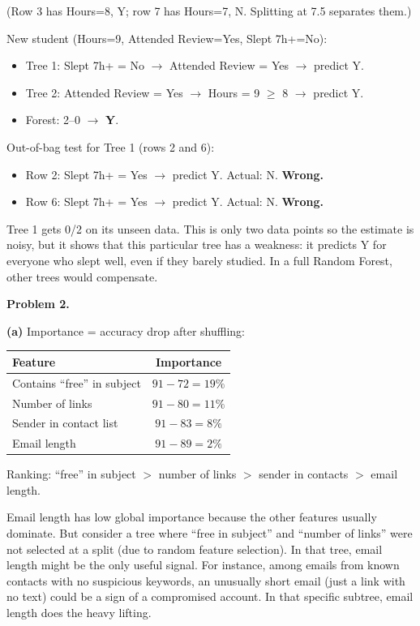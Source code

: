 \documentclass[11pt,a4paper]{article}
\begin{document}
(Row 3 has Hours=8, Y; row 7 has Hours=7, N. Splitting at 7.5 separates them.)

New student (Hours=9, Attended Review=Yes, Slept 7h+=No):
\begin{itemize}
\item Tree 1: Slept 7h+ = No $\to$ Attended Review = Yes $\to$ predict Y.
\item Tree 2: Attended Review = Yes $\to$ Hours = 9 $\geq$ 8 $\to$ predict Y.
\item Forest: 2--0 $\to$ \textbf{Y}.
\end{itemize}

Out-of-bag test for Tree 1 (rows 2 and 6):
\begin{itemize}
\item Row 2: Slept 7h+ = Yes $\to$ predict Y. Actual: N. \textbf{Wrong.}
\item Row 6: Slept 7h+ = Yes $\to$ predict Y. Actual: N. \textbf{Wrong.}
\end{itemize}

Tree 1 gets 0/2 on its unseen data. This is only two data points so the estimate is noisy, but it shows that this particular tree has a weakness: it predicts Y for everyone who slept well, even if they barely studied. In a full Random Forest, other trees would compensate.

\bigskip

\textbf{Problem 2.}

\textbf{(a)} Importance = accuracy drop after shuffling:

\begin{center}
\begin{tabular}{l|c}
Feature & Importance \\
\hline
Contains ``free'' in subject & $91 - 72 = 19\%$ \\
Number of links & $91 - 80 = 11\%$ \\
Sender in contact list & $91 - 83 = 8\%$ \\
Email length & $91 - 89 = 2\%$ \\
\end{tabular}
\end{center}

Ranking: ``free'' in subject $>$ number of links $>$ sender in contacts $>$ email length.

Email length has low global importance because the other features usually dominate. But consider a tree where ``free in subject'' and ``number of links'' were not selected at a split (due to random feature selection). In that tree, email length might be the only useful signal. For instance, among emails from known contacts with no suspicious keywords, an unusually short email (just a link with no text) could be a sign of a compromised account. In that specific subtree, email length does the heavy lifting.
\end{document}
